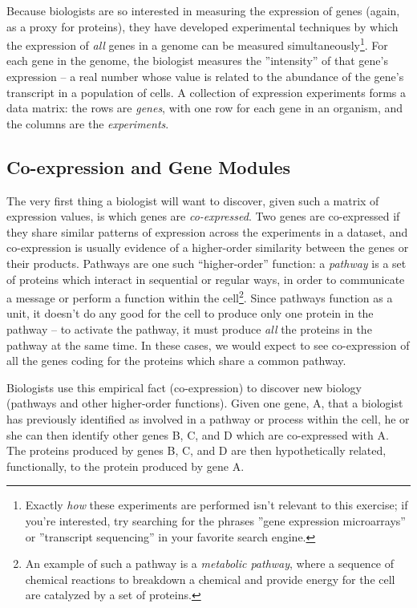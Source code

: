\documentclass{article}
\begin{document}
Because biologists are so interested in measuring the expression of genes (again, as a proxy for proteins), they have developed experimental techniques by which the expression of \emph{all} genes in a genome can be measured simultaneously\footnote{Exactly \emph{how} these experiments are performed isn't relevant to this exercise; if you're interested, try searching for the phrases ''gene expression microarrays'' or ''transcript sequencing'' in your favorite search engine.}.
For each gene in the genome, the biologist measures the ''intensity'' of that gene's expression -- a real number whose value is related to the abundance of the gene's transcript in a population of cells.   
A collection of expression experiments forms a data matrix: the rows are \emph{genes}, with one row for each gene in an organism, and the columns are the \emph{experiments}.  

\subsection{Co-expression and Gene Modules}

The very first thing a biologist will want to discover, given such a matrix of expression values, is which genes are \emph{co-expressed}.  
Two genes are co-expressed if they share similar patterns of expression across the experiments in a dataset, and co-expression is usually evidence of a higher-order similarity between the genes or their products.  
Pathways are one such ``higher-order'' function: a \emph{pathway} is a set of proteins which interact in sequential or regular ways, in order to communicate a message or perform a function within the cell\footnote{An example of such a pathway is a \emph{metabolic pathway}, where a sequence of chemical reactions to breakdown a chemical and provide energy for the cell are catalyzed by a set of proteins.}.  
Since pathways function as a unit, it doesn't do any good for the cell to produce only one protein in the pathway -- to activate the pathway, it must produce \emph{all} the proteins in the pathway at the same time.  
In these cases, we would expect to see co-expression of all the genes coding for the proteins which share a common pathway.  

Biologists use this empirical fact (co-expression) to discover new biology (pathways and other higher-order functions).  
Given one gene, A, that a biologist has previously identified as involved in a pathway or process within the cell, he or she can then identify other genes B, C, and D which are co-expressed with A.  
The proteins produced by genes B, C, and D are then hypothetically related, functionally, to the protein produced by gene A.  
\end{document}
